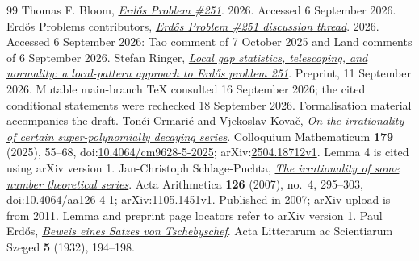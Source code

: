 \documentclass[11pt]{article}
\begin{document}
\begin{thebibliography}{99}
 Thomas F. Bloom, \href{https://www.erdosproblems.com/251}{\emph{Erd\H{o}s Problem \#251}}.
  2026. Accessed 6 September 2026.
 {Erdős Problems contributors}, \href{https://www.erdosproblems.com/forum/thread/251}{\emph{Erd\H{o}s Problem \#251 discussion thread}}.
  2026. Accessed 6 September 2026: Tao comment of 7 October 2025 and Land comments of 6 September 2026.
 Stefan Ringer, \href{https://github.com/StefanRinger/erdos-251}{\emph{Local gap statistics, telescoping, and normality: a local-pattern approach to Erd\H{o}s problem 251}}.
  Preprint, 11 September 2026. Mutable main-branch TeX consulted 16 September 2026; the cited conditional statements were rechecked 18 September 2026. Formalisation material accompanies the draft.
 Ton\'{c}i Crmari\'{c} and Vjekoslav Kova\v{c}, \href{https://arxiv.org/abs/2504.18712v1}{\emph{On the irrationality of certain super-polynomially decaying series}}.
  Colloquium Mathematicum \textbf{179} (2025), 55--68, doi:\href{https://doi.org/10.4064/cm9628-5-2025}{10.4064/cm9628-5-2025}; arXiv:\href{https://arxiv.org/abs/2504.18712v1}{2504.18712v1}. Lemma 4 is cited using arXiv version 1.
 Jan-Christoph Schlage-Puchta, \href{https://arxiv.org/abs/1105.1451v1}{\emph{The irrationality of some number theoretical series}}.
  Acta Arithmetica \textbf{126} (2007), no.~4, 295--303, doi:\href{https://doi.org/10.4064/aa126-4-1}{10.4064/aa126-4-1}; arXiv:\href{https://arxiv.org/abs/1105.1451v1}{1105.1451v1}. Published in 2007; arXiv upload is from 2011. Lemma and preprint page locators refer to arXiv version 1.
 Paul Erd\H{o}s, \href{https://users.renyi.hu/~p_erdos/1932-01.pdf}{\emph{Beweis eines Satzes von Tschebyschef}}.
  Acta Litterarum ac Scientiarum Szeged \textbf{5} (1932), 194--198.
\end{thebibliography}

\clearpage
\end{document}

